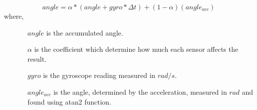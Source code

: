 \begin{equation*}
	angle = \alpha*(angle + gyro * \Delta t) + (1 - \alpha)(angle_{acc})
\end{equation*}
where,
\begin{enumerate}
	\item[]
\begin{enumerate}
	\item[$angle$] is the accumulated angle.
	\item[$\alpha$] is the coefficient which determine how much each sensor affects the result.
	\item[$gyro$] is the gyroscope reading measured in $rad/s$.
	\item[$angle_{acc}$] is the angle, determined by the acceleration, measured in $rad$ and found using atan2 function.
\end{enumerate}
\end{enumerate}
